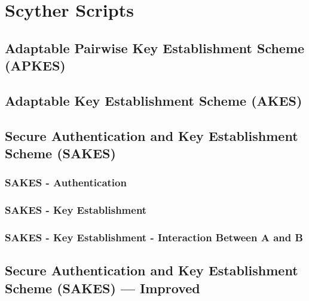 \chapter{Scyther Scripts}
\label{app:listings}


\section{Adaptable Pairwise Key Establishment Scheme (APKES)}
\label{app:apkes}



\section{Adaptable Key Establishment Scheme (AKES)}
\label{app:akes}



\newpage

\section{Secure Authentication and Key Establishment Scheme (SAKES)}
\label{app:sakes}

\subsection{SAKES - Authentication}
\label{app:sakes-auth}


\newpage

\subsection{SAKES - Key Establishment}
\label{app:sakes-keys}



\subsection{SAKES - Key Establishment - Interaction Between A and B}
\label{app:sakes-keys-ab}


\section{Secure Authentication and Key Establishment Scheme (SAKES) --- Improved}
\label{app:sakes-fixed-auth}



